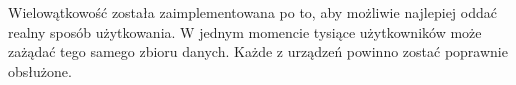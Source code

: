 Wielowątkowość została zaimplementowana po to, aby możliwie najlepiej oddać realny sposób użytkowania.
W jednym momencie tysiące użytkowników może zażądać tego samego zbioru danych. Każde z urządzeń powinno zostać poprawnie obsłużone.
